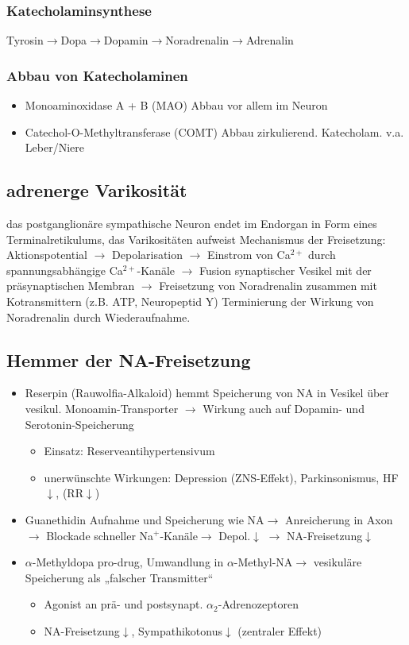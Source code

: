 \documentclass[10pt,a4paper]{report}
\begin{document}
\subsubsection{Katecholaminsynthese} Tyrosin$\rightarrow$Dopa$\rightarrow$Dopamin$\rightarrow$Noradrenalin$\rightarrow$Adrenalin
\subsubsection{Abbau von Katecholaminen}
\begin{itemize}
	\item Monoaminoxidase A + B (MAO) Abbau vor allem im Neuron
	\item Catechol-O-Methyltransferase (COMT) Abbau zirkulierend. Katecholam. v.a. Leber/Niere
\end{itemize}
\subsection{adrenerge Varikosität}
das postganglionäre sympathische Neuron endet im Endorgan in Form eines Terminalretikulums, das Varikositäten aufweist Mechanismus der Freisetzung: Aktionspotential $\rightarrow$ Depolarisation $\rightarrow$ Einstrom von Ca$^{2+}$ durch spannungsabhängige Ca$^{2+}$-Kanäle $\rightarrow$ Fusion synaptischer Vesikel mit der präsynaptischen Membran $\rightarrow$ Freisetzung von Noradrenalin zusammen mit Kotransmittern (z.B. ATP, Neuropeptid Y) Terminierung der Wirkung von Noradrenalin durch Wiederaufnahme.
\subsection{Hemmer der NA-Freisetzung}
\begin{itemize}
	\item Reserpin (Rauwolfia-Alkaloid) hemmt Speicherung von NA in Vesikel über vesikul. Monoamin-Transporter $\rightarrow$ Wirkung auch auf Dopamin- und Serotonin-Speicherung
	\begin{itemize}
		\item Einsatz: Reserveantihypertensivum
		\item unerwünschte Wirkungen: Depression (ZNS-Effekt), Parkinsonismus, HF$\downarrow$, (RR$\downarrow$)
	\end{itemize}		
	\item Guanethidin Aufnahme und Speicherung wie NA$\rightarrow$ Anreicherung in Axon$\rightarrow$ Blockade schneller Na$^+$-Kanäle$\rightarrow$ Depol.$\downarrow$ $\rightarrow$ NA-Freisetzung$\downarrow$
	\item $\alpha$-Methyldopa pro-drug, Umwandlung in $\alpha$-Methyl-NA$\rightarrow$ vesikuläre Speicherung als „falscher Transmitter“ 
	\begin{itemize}
		\item Agonist an prä- und postsynapt. $\alpha_2$-Adrenozeptoren 
		\item NA-Freisetzung$\downarrow$, Sympathikotonus$\downarrow$ (zentraler Effekt)
	\end{itemize}
\end{itemize}
\end{document}
